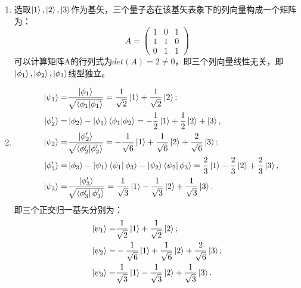 \documentclass[reqno,a4paper,12pt]{amsart}
\begin{document}
\begin{tcolorbox}[breakable, colback = black!5!white, colframe = black]

\begin{enumerate}[1]
\item 选取$\ket{1},\ket{2},\ket{3}$作为基矢，三个量子态在该基矢表象下的列向量构成一个矩阵为：
\[
A = 
\begin{pmatrix}
	1 & 0 & 1 \\
	1 & 1 & 0 \\
	0 & 1 & 1
\end{pmatrix}
\]
可以计算矩阵A的行列式为$det(A) = 2 \neq 0$，即三个列向量线性无关，即$\ket{\phi_1},\ket{\phi_2},\ket{\phi_3}$线型独立。

\item 
\begin{align*}
	& &\ket{\psi_1} =& \frac{\ket{\phi_1}}{\sqrt{\langle \phi_1 \vert \phi_1 \rangle}} = \frac{1}{\sqrt{2}} \ket{1} + \frac{1}{\sqrt{2}} \ket{2}; \\
	& &\ket{\phi_2'} =& \ket{\phi_2} - \ket{\phi_1} \langle \phi_1 \vert \phi_2 \rangle = -\frac{1}{2} \ket{1} + \frac{1}{2} \ket{2} + \ket{3}, \\
	& &\ket{\psi_2} =& \frac{\ket{\phi_2'}}{\sqrt{\langle \phi_2' \vert \phi_2' \rangle}} = -\frac{1}{\sqrt{6}} \ket{1} + \frac{1}{\sqrt{6}} \ket{2} + \frac{2}{\sqrt{6}} \ket{3}; \\
	& &\ket{\phi_3'} =& \ket{\phi_3} - \ket{\psi_1} \bra{\psi_1} \phi_3 \rangle - \ket{\psi_2}\bra{\psi_2} \phi_3 \rangle = \frac{2}{3}\ket{1} - \frac{2}{3}\ket{2} + \frac{2}{3}\ket{3}, \\
	& &\ket{\psi_3} =& \frac{\ket{\phi_3'}}{\sqrt{\bra{\phi_3'} \phi_3' \rangle}} = \frac{1}{\sqrt{3}}\ket{1} - \frac{1}{\sqrt{3}}\ket{2} + \frac{1}{\sqrt{3}}\ket{3}.
\end{align*}
即三个正交归一基矢分别为：
\begin{align*}
	\ket{\psi_1} =& \frac{1}{\sqrt{2}} \ket{1} + \frac{1}{\sqrt{2}} \ket{2}; \\
	\ket{\psi_2} =& -\frac{1}{\sqrt{6}} \ket{1} + \frac{1}{\sqrt{6}} \ket{2} + \frac{2}{\sqrt{6}} \ket{3}; \\
	\ket{\psi_3} =& \frac{1}{\sqrt{3}}\ket{1} - \frac{1}{\sqrt{3}}\ket{2} + \frac{1}{\sqrt{3}}\ket{3}.
\end{align*}

\end{enumerate}

\end{tcolorbox}
\end{document}
